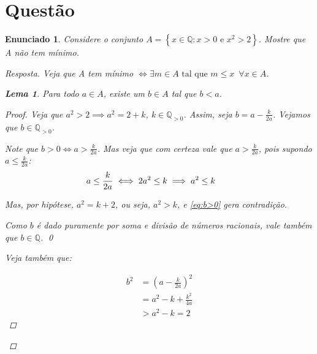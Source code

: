 \documentclass[a4paper,twoside,11pt]{article}
\newtheorem*{enunciado}{Enunciado}
\newtheorem*{lemma}{Lema}
\begin{document}
\section{Questão}
\begin{enunciado}
    Considere o conjunto $A = \left\{ x \in \mathbb{Q} : x > 0 \text{ e } x^2 > 2 \right\}$.
    Mostre que A não tem mínimo.

    \begin{proof}[Resposta]
        Veja que A tem mínimo $\iff \exists m \in A \text{ tal que } m \leq x \enspace \forall x \in A$.

        \begin{lemma}
            Para todo $a \in A$, existe um $b \in A$ tal que $b < a$.

            \begin{proof}
                Veja que $a^2 > 2 \implies a^2 = 2 + k$, $k \in \mathbb{Q}_{>0}$.
                Assim, seja $b = a - \frac{k}{2a}$. Vejamos que $b \in \mathbb{Q}_{>0}$.
                
                Note que $b > 0 \iff a > \frac{k}{2a}$. Mas veja que com certeza vale que
                $a > \frac{k}{2a}$, pois supondo $a \leq \frac{k}{2a}$:
                \begin{equation} \label{eq:b>0}
                    \begin{split}
                         a \leq \frac{k}{2a} \iff 2a^2 \leq k \implies a^2 \leq k \text
                         \qquad 
                    \end{split}
                \end{equation}

                Mas, por hipótese, $a^2 = k + 2$, ou seja, $a^2 > k$, e \ref{eq:b>0} gera
                contradição.

                Como $b$ é dado puramente por soma e divisão de números racionais, vale também que
                $b \in \mathbb{Q}$. \qed

                Veja também que:

                \begin{equation} \label{eq:b^2_>_2}
                    \begin{split}
                        b^2 &= (a - \frac{k}{2a})^2 \\
                            &= a^2 - k + \frac{k^2}{4a} \\
                            &> a^2 - k = 2
                    \end{split}
                \end{equation}


\end{proof}
\end{lemma}
\end{proof}
\end{enunciado}
\end{document}
